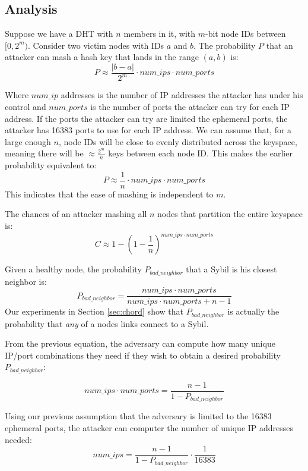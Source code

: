 \documentclass[11pt,conference]{IEEEtran}
\begin{document}

\subsection{Analysis}
Suppose we have a DHT with $n$ members in it, with $m$-bit node IDs between $[0,2^{m})$. 
Consider two victim nodes with IDs $a$ and $b$.
The probability $P$ that an attacker can mash a hash key that lands in the range $(a,b)$ is:
$$ P \approx \frac{|b-a|}{2^{m}}\cdot num\_ips \cdot num\_ports  $$

Where $num\_ip$ addresses is the number of IP addresses the attacker has under his control and $num\_ports$ is the number of ports the attacker can try for each IP address.
If the ports the attacker can try are limited the ephemeral ports, the attacker has 16383 ports to use for each IP address.
We can assume that, for a large enough $n$, node IDs will be close to evenly distributed across the keyspace, meaning there will be $\approx \frac{2^{m}}{n}$ keys between each node ID.
This makes the earlier probability equivalent to:
$$ P \approx \frac{1}{n}\cdot num\_ips \cdot num\_ports  $$
This indicates that the ease of mashing is independent to $m$.

The chances of an attacker mashing all $n$ nodes that partition the entire keyspace is:
$$C \approx  1 - (1 -\frac{1}{n})^{num\_ips \cdot num\_ports}  $$


Given a healthy node, the probability $P_{bad\_neighbor}$ that a Sybil is his closest neighbor is:
\begin{equation}
P_{bad\_neighbor} =  \frac{num\_ips \cdot num\_ports}{num\_ips \cdot num\_ports + n - 1}
\label{eq:bad}
\end{equation}
Our experiments in Section \ref{sec:chord} show that $P_{bad\_neighbor}$ is actually the probability that \textit{any} of a nodes links connect to a Sybil.

From the previous equation, the adversary can compute how many unique IP/port combinations they need if they wish to obtain a desired probability $P_{bad\_neighbor}$:

$$ num\_ips \cdot num\_ports =  \frac{n - 1}{1 - P_{bad\_neighbor} }$$

Using our previous assumption that the adversary is limited to the 16383 ephemeral ports, the attacker can computer the number of unique IP addresses needed:
$$ num\_ips  =  \frac{n - 1}{1 - P_{bad\_neighbor} }  \cdot \frac{1}{16383}$$
\end{document}
